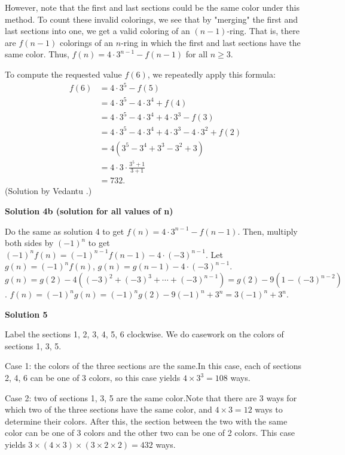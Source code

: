 \begin{enumerate}
 However, note that the first and last sections could be the same color under this method. To count these invalid colorings, we see that by "merging" the first and last sections into one, we get a valid coloring of an $(n-1)$-ring. That is, there are $f(n-1)$ colorings of an $n$-ring in which the first and last sections have the same color. Thus, $f(n) = 4 \cdot 3^{n-1} - f(n-1)$ for all $n \ge 3$.

 To compute the requested value $f(6)$, we repeatedly apply this formula: 
 \begin{align*} f(6)&=4\cdot3^5-f(5)\\&=4\cdot3^5-4\cdot3^4+f(4)\\&=4\cdot3^5-4\cdot3^4+4\cdot3^3-f(3)\\&=4\cdot3^5-4\cdot3^4+4\cdot3^3-4\cdot3^2+f(2)\\&=4(3^5-3^4+3^3-3^2+3)\\&=4\cdot3\cdot\frac{3^5+1}{3+1}\\&=\boxed{732}.\end{align*}
 (Solution by Vedantu .)

 



\textbf{Solution 4b (solution for all values of n)}

Do the same as solution 4 to get $f(n) = 4 \cdot 3^{n-1} - f(n-1)$. Then, multiply both sides by $(-1)^{n}$ to get $(-1)^{n}f(n) = (-1)^{n-1}f(n-1) - 4 \cdot (-3)^{n-1}$. Let $g(n) = (-1)^{n}f(n)$, $g(n) = g(n-1) - 4 \cdot (-3)^{n-1}$. $g(n) = g(2) - 4((-3)^{2}+(-3)^{3}+ \cdots + (-3)^{n-1}) = g(2) - 9(1-(-3)^{n-2})$. $f(n) = (-1)^{n}g(n) = (-1)^{n}g(2)-9(-1)^{n}+3^{n} = \boxed{3(-1)^{n}+3^{n}}$.

 



\textbf{Solution 5}

Label the sections 1, 2, 3, 4, 5, 6 clockwise. We do casework on the colors of sections 1, 3, 5.

 Case 1: the colors of the three sections are the same.In this case, each of sections 2, 4, 6 can be one of 3 colors, so this case yields $4 \times 3^3 = 108$ ways.

 Case 2: two of sections 1, 3, 5 are the same color.Note that there are 3 ways for which two of the three sections have the same color, and $4 \times 3 = 12$ ways to determine their colors. After this, the section between the two with the same color can be one of 3 colors and the other two can be one of 2 colors. This case yields $3 \times (4 \times 3) \times (3 \times 2 \times 2) = 432$ ways.


\end{enumerate}
